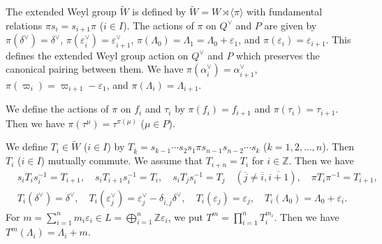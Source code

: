 \documentclass[12pt,twoside]{article}
\newcommand\bra{\langle}
\newcommand\ket{\rangle}
\newcommand\av{\alpha^\vee}
\newcommand\eps{\varepsilon}
\newcommand\epsv{\eps^\vee}
\newcommand\deltav{\delta^\vee}
\newcommand\Qv{Q^\vee}
\newcommand\tW{{\widetilde W}}
\newcommand\Z{{\mathbb Z}} %
\theoremstyle{plain} %
\theoremstyle{definition} %
\theoremstyle{definition} %
\numberwithin{theorem}{section}
\numberwithin{equation}{section}
\numberwithin{figure}{section}
\numberwithin{table}{section}
\begin{document}
The extended Weyl group $\tW$ is defined by
$\tW = W\rtimes\bra\pi\ket$ with fundamental relations 
$\pi s_i = s_{i+1} \pi$ ($i\in I$).
The actions of $\pi$ on $\Qv$ and $P$ are given by
$\pi(\deltav)=\deltav$,
$\pi(\epsv_i)=\epsv_{i+1}$,
$\pi(\Lambda_0)=\Lambda_1=\Lambda_0+\eps_1$, and 
$\pi(\eps_i)=\eps_{i+1}$.
This defines the extended Weyl group action on $\Qv$ and $P$
which preserves the canonical pairing between them.
We have $\pi(\av_i)=\av_{i+1}$, 
$\pi(\varpi_i)=\varpi_{i+1}-\eps_1$, and
$\pi(\Lambda_i)=\Lambda_{i+1}$.

We define the actions of $\pi$ on $f_i$ and $\tau_i$ by
$\pi(f_i)=f_{i+1}$ and $\pi(\tau_i)=\tau_{i+1}$.
Then we have $\pi(\tau^\mu)=\tau^{\pi(\mu)}$ ($\mu\in P$).

We define $T_i\in\tW$ ($i\in I$) by 
$T_{\overline{k}}=s_{k-1}\cdots s_2s_1\pi s_{n-1}s_{n-2}\cdots s_k$
($k=1,2,\ldots,n$).  Then $T_i$ ($i\in I$) mutually commute.
We assume that $T_{i+n}=T_i$ for $i\in\Z$.
Then we have
\begin{align*}
 &
 s_i T_i s_i^{-1} = T_{i+1}, \quad
 s_i T_{i+1} s_i^{-1} = T_i, \quad
 s_i T_j s_i^{-1} = T_j \quad (\overline{j}\ne\overline{i},\overline{i+1}), \quad
 \pi T_i \pi^{-1}= T_{i+1},
 \\ & 
 T_i(\deltav)=\deltav, \quad
 T_i(\epsv_j)=\epsv_j-\delta_{\overline{i},\overline{j}}\deltav, \quad
 T_i(\eps_j)=\eps_j, \quad
 T_i(\Lambda_0)=\Lambda_0+\eps_i.
\end{align*} 
For $m=\sum_{i=1}^nm_i\eps_i\in L=\bigoplus_{i=1}^n\Z\eps_i$,
we put $T^m = \prod_{i=1}^n T_i^{m_i}$.
Then we have $T^m(\Lambda_i)=\Lambda_i+m$.
\end{document}
